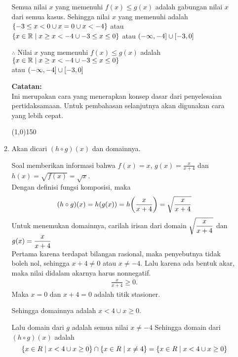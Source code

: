 \begin{enumerate}[leftmargin=*, label={\arabic*}.]
\begin{enumerate}[label={\alph*}.]
    Semua nilai $x$ yang memenuhi $f(x) \leq g(x)$ adalah gabungan nilai $x$ 
    dari semua kasus. Sehingga nilai $x$ yang memenuhi adalah 
    $\set*{-3 \leq x < 0 \cup x = 0 \cup x < -4}$ atau \\
    $\set*{x \in \mathbb{R} \mid x \geq x < -4 \cup -3 \leq x \leq 0}$
    atau $\oic*{-\infty, -4} \cup \cic*{-3,0}$
        
    $\therefore$ Nilai $x$ yang memenuhi $f(x) \leq g(x)$ adalah
    $\set*{x \in \mathbb{R} \mid x \geq x < -4 \cup -3 \leq x \leq 0}$\\
    atau $\oic*{-\infty, -4} \cup \cic*{-3,0}$
        
    \vspace{0.1cm}
    \textbf{Catatan:}\\
    Ini merupakan cara yang menerapkan konsep dasar dari penyelesaian
    pertidaksamaan. Untuk pembahasan selanjutnya akan digunakan cara yang 
    lebih cepat.


\begin{center}\line(1,0){150}\end{center}


    \item Akan dicari $(h \circ g)(x)$ dan domainnya.
    
    Soal memberikan informasi bahwa $f(x) = x$, $g(x) = \frac{x}{x+4}$ 
    dan $h(x) = \sqrt{f(x)} = \sqrt{x}$.\\
    Dengan definisi fungsi komposisi, maka
    \[
        (h \circ g)(x) = h(g(x)) = h\brk*{\frac{x}{x+4}} 
        = \sqrt{\frac{x}{x+4}}
    \]
    Untuk menemukan domainnya, carilah irisan dari domain  
    $\ds \sqrt{\frac{x}{x+4}}$ dan $g(x)=\ds\frac{x}{x+4}$\\
    Pertama karena terdapat bilangan rasional, maka penyebutnya tidak boleh
    nol, sehingga $x+4 \neq 0$ atau $x\neq-4$. Lalu karena ada bentuk akar, 
    maka nilai didalam akarnya harus nonnegatif.
    \begin{align*}
        \frac{x}{x+4} \geq 0.
    \end{align*}
    Maka $x=0$ dan $x+4=0$ adalah titik stasioner.

    
    
    Sehingga domainnya adalah $x < 4 \cup x \geq 0$.

    Lalu domain dari $g$ adalah semua nilai $x \neq -4$
    Sehingga domain dari $(h \circ g)(x)$ adalah
    \[
    \set*{x \in R \mid x < 4 \cup x \geq 0} \cap \set*{x \in R \mid x \neq 4} 
    = \set*{x \in R \mid x < 4 \cup x \geq 0}
    \]


\end{enumerate}
\end{enumerate}

